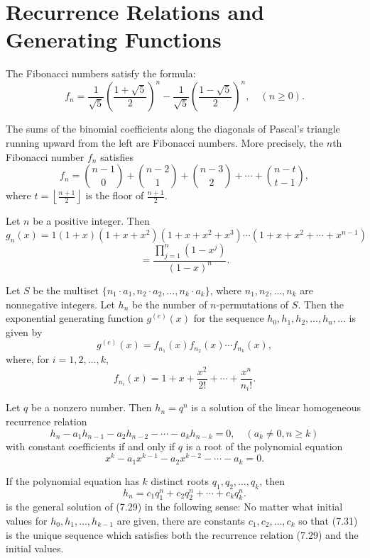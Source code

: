 \chapter{Recurrence Relations and Generating Functions}
\begin{theorem}
 \label{thm:7.1.1}
The Fibonacci numbers satisfy the formula:
\[
f_n = \frac{1}{\sqrt{5}} \left( \frac{1 + \sqrt{5}}{2} \right)^n - \frac{1}{\sqrt{5}} \left( \frac{1 - \sqrt{5}}{2} \right)^n, \quad (n \geq 0).\tag{7.8}
\]
\end{theorem}


\begin{theorem}
 \label{thm:7.1.2}
The sums of the binomial coefficients along the diagonals of Pascal's triangle running upward from the left are Fibonacci numbers. More precisely, the $n$th Fibonacci number $f_n$ satisfies
\[
f_n = \binom{n-1}{0} + \binom{n-2}{1} + \binom{n-3}{2} + \cdots + \binom{n-t}{t-1},
\]
where $t = \left\lfloor \frac{n+1}{2} \right\rfloor$ is the floor of $\frac{n+1}{2}$.
\end{theorem}

\begin{theorem}
  \label{thm:7.2.1}
Let $n$ be a positive integer. Then
\[
g_n(x) = 1(1 + x)(1 + x + x^2)(1 + x + x^2 + x^3) \cdots (1 + x + x^2 + \cdots + x^{n-1})
\]
\[
= \frac{\prod_{j=1}^n (1 - x^j)}{(1 - x)^n}.\tag{7.14}
\]
\end{theorem}

\begin{theorem}
\label{thm:7.3.1}
 Let $S$ be the multiset $\{n_1 \cdot a_1, n_2 \cdot a_2, \dots, n_k \cdot a_k\}$, where $n_1, n_2, \dots, n_k$ are nonnegative integers. Let $h_n$ be the number of $n$-permutations of $S$. Then the exponential generating function $g^{(e)}(x)$ for the sequence $h_0, h_1, h_2, \dots, h_n, \dots$ is given by
\[
    g^{(e)}(x) = f_{n_1}(x) f_{n_2}(x) \cdots f_{n_k}(x), \tag{7.18}
\]
where, for $i = 1, 2, \dots, k$,
\[
    f_{n_i}(x) = 1 + x + \frac{x^2}{2!} + \cdots + \frac{x^n}{{n_i}!}. 
\]
\end{theorem}



\begin{theorem}
  \label{thm:7.4.1}
Let $q$ be a nonzero number. Then $h_n = q^n$ is a solution of the linear homogeneous recurrence relation
\[
    h_n - a_1 h_{n-1} - a_2 h_{n-2} - \cdots - a_k h_{n-k} = 0, \quad (a_k \neq 0, n \geq k) \tag{7.29}
\]
with constant coefficients if and only if $q$ is a root of the polynomial equation
\[
    x^k - a_1 x^{k-1} - a_2 x^{k-2} - \cdots - a_k = 0. \tag{7.30}
\]

If the polynomial equation has $k$ distinct roots $q_1, q_2, \dots, q_k$, then
\[
h_n = c_1 q_1^n + c_2 q_2^n + \cdots + c_k q_k^n. \tag{7.31}
\]
is the general solution of (7.29) in the following sense: No matter what initial values for 
$h_0, h_1, \dots, h_{k-1}$ are given, there are constants $c_1, c_2, \dots, c_k$ so that (7.31) 
is the unique sequence which satisfies both the recurrence relation (7.29) and the initial values.


\end{theorem}


